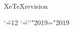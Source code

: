 
\begingroup

\expandafter\ifx\csname XeTeXrevision\endcsname\relax
\else

  \catcode`\"=12
  \def\n#1{}%
  \def\a{\errmessage{Hyphenation pattern file corrupted!}}%
  \let\o=\a
  \def\ae{^^^^00e6}%
  \def\oe{^^^^0153}%
  \lccode`\'=`\' %
  \lccode"2019="2019 %

  \let\PATTERNS=\patterns
  \def\patterns{%
    \endgroup %
    \begingroup %
    \PATTERNS{2^^^^20192}%
    \PATTERNS %
  }

\fi



\endgroup
\endinput
